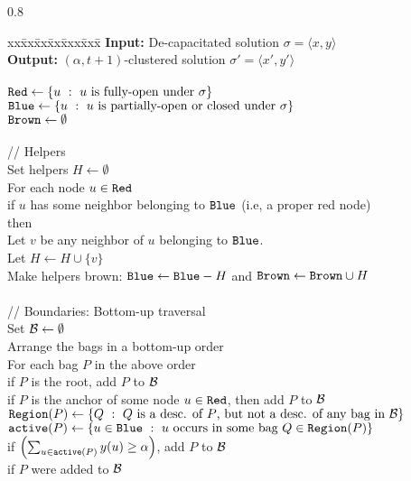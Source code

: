 \documentclass[11pt]{article}
\newcommand{\myactive} {{\tt active}}
\newcommand{\pair}[2] {\langle #1, #2\rangle}
\newcommand{\myred} {{\tt Red}}
\newcommand{\myblue} {{\tt Blue}}
\newcommand{\mybrown} {{\tt Brown}}
\newcommand{\myreg} {{\tt Region}}
\newcommand{\calB} {{\cal B}}
\begin{document}
\begin{figure}
\begin{center}
\begin{boxedminipage}{0.8\hsize}
\begin{tabbing}
xx\=xx\=xx\=xx\=xxx\=xxx\=\kill
\> \textbf{Input:} De-capacitated solution $\sigma = \pair{x}{y}$\\
\> \textbf{Output:} $(\alpha, t+1)$-clustered solution $\sigma' = \pair{x'}{y'}$\\
\>\\
\> $\myred \leftarrow \{u~:~\mbox{$u$ is fully-open under $\sigma$}\}$\\
\> $\myblue \leftarrow \{u~:~\mbox{$u$ is partially-open or closed under $\sigma$}\}$\\
\> $\mybrown \leftarrow \emptyset$\\
\>\\
\> // Helpers\\
\> Set helpers $H\leftarrow \emptyset$\\
\> For each node $u\in \myred$\\
\> \> if $u$ has some neighbor belonging to $\myblue$ (i.e, a proper red node) then\\
\> \> \> Let $v$ be any neighbor of $u$ belonging to $\myblue$. \\
\> \> \> Let $H \leftarrow H\cup \{v\}$\\
\> Make helpers brown: $\myblue \leftarrow \myblue - H$ and $\mybrown \leftarrow \mybrown \cup H$\\
\>\\
\>// Boundaries: Bottom-up traversal\\
\> Set $\calB \leftarrow \emptyset$\\
\> Arrange the bags in a bottom-up order\\
\> For each bag $P$ in the above order\\
\> \> if $P$ is the root, add $P$ to $\calB$\\
\> \> if $P$ is the anchor of some node $u\in \myred$, then add $P$ to $\calB$\\
\> \> $\myreg(P) \leftarrow \{Q~:~\mbox{$Q$ is a desc. of $P$, but not a desc. of any bag in $\calB$}\}$\\
\> \> $\myactive(P) \leftarrow \{u\in \myblue~:~\mbox{$u$ occurs in some bag $Q\in \myreg(P)$}\}$\\
\> \> if $\left(\sum_{u\in \myactive(P)}y(u) \geq \alpha\right)$, add $P$ to $\calB$\\
\> \> if $P$ were added to $\calB$\\

\end{tabbing}
\end{boxedminipage}
\end{center}
\end{figure}
\end{document}
